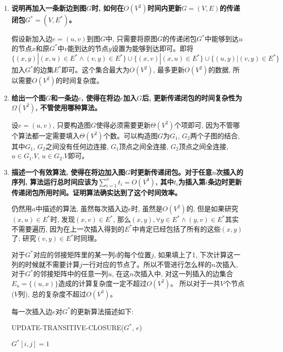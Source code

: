 \documentclass[paper=a4, fontsize=11pt]{scrartcl} %
\numberwithin{equation}{section} %
\numberwithin{figure}{section} %
\numberwithin{table}{section} %
\begin{document}
\begin{enumerate}[a]
\item \textbf{说明再加入一条新边到图$G$时, 如何在$O(V^2)$时间内更新$G=(V,E)$的传递闭包$G^{*} = (V, E^{*})$。}

  假设新加入边$e = (u, v)$到图$G$中, 只需要将原图$G$的传递闭包$G^{*}$中能够到达$u$的节点$x$和原$G^{*}$中$v$能到达的节点$y$设置为能够到达即可。即将$\{(x, y) | (x, u) \in E^{*} \land (v, y) \in E^{*} \} \cup \{(x, v) | (x, u) \in E^{*}\} \cup \{(u, y) | (v, y) \in E^{*}\}$加入$G^{*}$的边集$E^{*}$即可。这个集合最大为$O(V^2)$, 最多更新$O(V^2)$的数据, 所以需要$O(V^2)$的时间复杂度。

\item \textbf{给出一个图$G$和一条边$e$, 使得在将边$e$加入$G$后, 更新传递闭包的时间复杂性为$\Omega(V^2)$, 不管使用哪种算法。}

  设$e = (u, v)$, 只要构造图$G$使得必须需要更新$\Theta(V^2)$个项即可, 因为不管哪个算法都一定需要填入$\Theta(V^2)$个数。可以构造图$G$为$G_1$, $G_2$两个子图的结合, 其中$G_1$, $G_2$之间没有任何边连接, $G_1$顶点之间全连接, $G_2$顶点之间全连接, $u \in G_1.V$, $u \in G_2. V$即可。

\item \textbf{描述一个有效算法, 使得在将边加入图$G$时更新传递闭包。对于任意$n$次插入的序列, 算法运行总时间应该为$\sum_{i=1}^n t_i = O(V^3)$, 其中$t_i$为插入第$i$条边时更新传递闭包所用时间。证明算法确实达到了这个时间效率。}

  仍然用$a$中描述的算法, 虽然每次插入边$e$时, 虽然是$O(V^2)$的, 但是如果研究$(x, u) \in E^{*}$时, 发现$(x, v) \in E^{*}$, 那么$(x, y), \forall y \in E^{*} \land (y, v) \in E^{*}$其实不需要遍历, 因为在上一次插入得到的$E^{*}$中肯定已经包括了所有的这些$(x, y)$了; 研究$(v, y) \in E^{*}$时同理。

  对于$G^{*}$对应的邻接矩阵里的某一列$i$的每个位置$j$, 如果填上了1, 下次计算这一列的时候就不需要计算$j$一行对应的节点了。所以不管进行怎么样的$n$次插入, 对于$G^{*}$的邻接矩阵中的任意一列$u$, 在这$n$次插入中, 对这一列插入的边集合$E_u = \{(u, x)\}$造成的计算复杂度一定不超过$O(V^2)$。 所以对于一共$V$个节点($V$列), 总的复杂度不超过$O(V^3)$。

  每一次插入边$e$对$G^{*}$的更新算法描述如下:

\begin{algorithm}[H]
  \caption{UPDATE-TRANSITIVE-CLOSURE($G^{*}$, $e$)}
  \label{algo:2}
  \begin{algorithmic}
    \State $G^{*}[i, j] = 1$
    \EndIf
    \EndFor
    \EndIf
    \EndFor
  \end{algorithmic}
\end{algorithm}

\end{enumerate}
\end{document}
